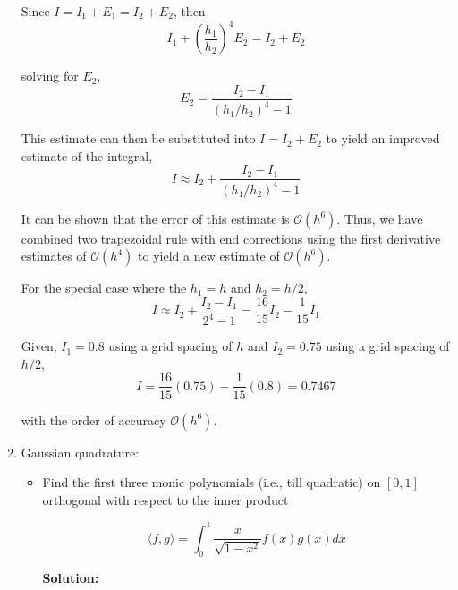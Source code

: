 \documentclass[a4paper,11pt]{report}
\begin{document}
\begin{enumerate}
    Since $I = I_{1} + E_{1} = I_{2} + E_{2}$, then 
    \begin{equation*}
    I_{1} + \left( \frac{h_{1}}{h_{2}} \right)^{4} E_{2} = I_{2} + E_{2}
    \end{equation*}
    
    solving for $E_{2}$,
    \begin{equation*}
    E_{2} = \frac{I_{2} - I_{1}}{(h_{1}/h_{2})^{4} - 1}
    \end{equation*}
    
    This estimate can then be substituted into $I = I_{2} + E_{2}$ to yield an improved estimate of the integral,
    \begin{equation*}
    I \approx I_{2} + \frac{I_{2} - I_{1}}{(h_{1}/h_{2})^{4} - 1}
    \end{equation*}

    It can be shown that the error of this estimate is $\mathcal{O}(h^{6})$. Thus, we have combined two trapezoidal rule with end corrections using the first
    derivative estimates of $\mathcal{O}(h^{4})$ to yield a new estimate of $\mathcal{O}(h^{6})$.

    For the special case where the $h_{1} = h$ and $h_{2} = h/2$,
    \begin{equation*}
    I \approx I_{2} + \frac{I_{2} - I_{1}}{2^{4} - 1} = \frac{16}{15} I_{2} - \frac{1}{15} I_{1}
    \end{equation*}

    Given, $I_{1} = 0.8$ using a grid spacing of $h$ and $I_{2} = 0.75$ using a grid spacing of $h/2$,
    \begin{equation*}
    I = \frac{16}{15} (0.75) - \frac{1}{15} (0.8) = 0.7467
    \end{equation*}
    
    with the order of accuracy $\mathcal{O}(h^{6})$.
    

    \item Gaussian quadrature:
    \begin{itemize}
        \item Find the first three monic polynomials (i.e., till quadratic) on $[0, 1]$
        orthogonal with respect to the inner product

            \begin{equation*}
            \langle f, g \rangle = \int_{0}^{1} \frac{x}{\sqrt{1 - x^{2}}} f(x) g(x) dx
            \end{equation*}

    \textbf{Solution:}


\end{itemize}
\end{enumerate}
\end{document}
